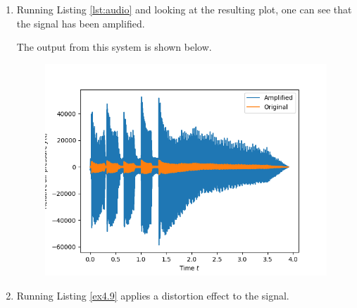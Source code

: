 \begin{enumerate}
\item Running Listing \ref{lst:audio} and looking at the resulting plot, one can see that the signal has been amplified. 

The output from this system is shown below. 
\begin{figure}
\centering
\includegraphics[scale=0.9]{ch04/figures/ex7_plot.png}
\end{figure}

\item Running Listing \ref{ex4.9} applies a distortion effect to the signal. 


\end{enumerate}